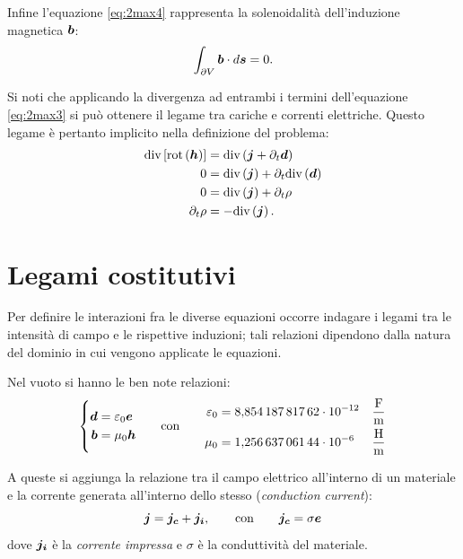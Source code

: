 Infine l'equazione \eqref{eq:2max4} rappresenta la solenoidalità dell'induzione magnetica $\boldsymbol{b}$:
\begin{equation}
\label{eq:2solen}
\int_{\partial V} \boldsymbol{b} \cdot d\boldsymbol{s} = 0.
\end{equation}

Si noti che applicando la divergenza ad entrambi i termini dell'equazione \eqref{eq:2max3} si può ottenere il legame tra cariche e correnti elettriche. Questo legame è pertanto implicito nella definizione del problema:
\begin{align}
\label{eq:2corr1}
\text{div} \left[ \text{rot}\left(\boldsymbol{h}\right) \right] &= \text{div} \left(\boldsymbol{j}+\partial_t \boldsymbol{d} \right) \nonumber\\
0&=\text{div} \left(\boldsymbol{j}\right) + \partial_t \text{div} \left(\boldsymbol{d}\right) \nonumber\\
0&=\text{div} \left(\boldsymbol{j}\right) + \partial_t\rho\nonumber\\
\partial_t \rho &= - \text{div} \left(\boldsymbol{j}\right).
\end{align}

\section{Legami costitutivi}

Per definire le interazioni fra le diverse equazioni occorre indagare i legami tra le intensità di campo e le rispettive induzioni; tali relazioni dipendono dalla natura del dominio in cui vengono applicate le equazioni. 

Nel vuoto si hanno le ben note relazioni:
\begin{equation}
\label{eq:2cost}
\left\{
\begin{aligned}
\boldsymbol{d} &= \varepsilon_0 \boldsymbol{e}\\
\boldsymbol{b} &= \mu_0 \boldsymbol{h}
\end{aligned}
\qquad\text{con}\qquad
\begin{aligned}
\varepsilon_0&=8{,}854\,187\,817\,62\cdot 10^{-12} &\frac{\text{F}}{\text{m}}\\
\mu_0&= 1{,}256\,637\,061\,44\cdot10^{-6} &\frac{\text{H}}{\text{m}}
\end{aligned}
\right.
\end{equation}

A queste si aggiunga la relazione tra il campo elettrico all'interno di un materiale e la corrente generata all'interno dello stesso (\textit{conduction current}):
\begin{equation}
\label{eq:2conduction_current}
\boldsymbol{j}=\boldsymbol{j_c}+\boldsymbol{j_i}, \qquad \text{con}\qquad \boldsymbol{j_c}=\sigma \boldsymbol{e}
\end{equation}
dove $\boldsymbol{j_i}$ è la \textit{corrente impressa} e $\sigma$ è la conduttività del materiale. 

